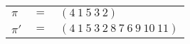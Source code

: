 \begin{example}\label{example:ZMGTJRFE}
  \hfill \break
  \begin{tabular}{lll}
    $\pi$  & $=$ & $(4~1~5~3~2)$ \\
    $\pi'$ & $=$ & $(4~1~5~3~2~8~7~6~9~10~11)$ \\
  \end{tabular}
\end{example}